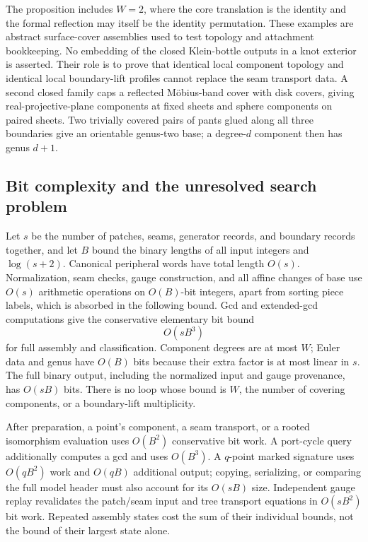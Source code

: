 The proposition includes $W=2$, where the core translation is the identity
and the formal reflection may itself be the identity permutation.  These
examples are abstract surface-cover assemblies used to test topology and
attachment bookkeeping.  No embedding of the closed Klein-bottle outputs
in a knot exterior is asserted.  Their role is to prove that identical
local component topology and identical local boundary-lift profiles cannot
replace the seam transport data.  A second closed family caps a reflected
M\"obius-band cover with disk covers, giving real-projective-plane components
at fixed sheets and sphere components on paired sheets.  Two trivially
covered pairs of pants glued along all three boundaries give an orientable
genus-two base; a degree-$d$ component then has genus $d+1$.

\subsection{Bit complexity and the unresolved search problem}

Let $s$ be the number of patches, seams, generator records, and boundary
records together, and let $B$ bound the binary lengths of all input integers
and $\log(s+2)$.  Canonical peripheral words have total length $O(s)$.
Normalization, seam checks, gauge construction, and all affine changes of
base use $O(s)$ arithmetic operations on $O(B)$-bit integers, apart from
sorting piece labels, which is absorbed in the following bound.  Gcd and
extended-gcd computations give the conservative elementary bit bound
\[
 O(sB^3)
\]
for full assembly and classification.  Component degrees are at most $W$;
Euler data and genus have $O(B)$ bits because their extra factor is at most
linear in $s$.  The full binary output, including the normalized input and
gauge provenance, has $O(sB)$ bits.  There is no loop whose bound is $W$,
the number of covering components, or a boundary-lift multiplicity.

After preparation, a point's component, a seam transport, or a rooted
isomorphism evaluation uses $O(B^2)$ conservative bit work.  A port-cycle
query additionally computes a gcd and uses $O(B^3)$.  A $q$-point marked
signature uses $O(qB^2)$ work and $O(qB)$ additional output; copying,
serializing, or comparing the full model header must also account for its
$O(sB)$ size.  Independent gauge replay revalidates the patch/seam input
and tree transport equations in $O(sB^2)$ bit work.  Repeated assembly
states cost the sum of their individual bounds, not the bound of their
largest state alone.

